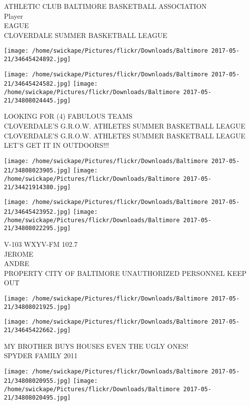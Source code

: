 \documentclass[10pt,letterpaper]{article}
\begin{document}
ATHLETIC CLUB BALTIMORE BASKETBALL ASSOCIATION\\
Player\\
EAGUE\\
CLOVERDALE SUMMER BASKETBALL LEAGUE
\pagebreak

\texttt{[image: /home/swickape/Pictures/flickr/Downloads/Baltimore 2017-05-21/34645424892.jpg]}

\vspace{0.25in}
\texttt{[image: /home/swickape/Pictures/flickr/Downloads/Baltimore 2017-05-21/34645424582.jpg]}
\texttt{[image: /home/swickape/Pictures/flickr/Downloads/Baltimore 2017-05-21/34808024445.jpg]}

LOOKING FOR (4) FABULOUS TEAMS\\
CLOVERDALE'S G.R.O.W. ATHLETES SUMMER BASKETBALL LEAGUE\\
CLOVERDALE'S G.R.O.W. ATHLETES SUMMER BASKETBALL LEAGUE LET'S GET IT IN OUTDOORS!!!
\pagebreak

\texttt{[image: /home/swickape/Pictures/flickr/Downloads/Baltimore 2017-05-21/34808023905.jpg]}
\texttt{[image: /home/swickape/Pictures/flickr/Downloads/Baltimore 2017-05-21/34421914380.jpg]}

\texttt{[image: /home/swickape/Pictures/flickr/Downloads/Baltimore 2017-05-21/34645423952.jpg]}
\texttt{[image: /home/swickape/Pictures/flickr/Downloads/Baltimore 2017-05-21/34808022295.jpg]}

V{-}103 WXYV{-}FM 102.7\\
JEROME\\
ANDRE\\
PROPERTY CITY OF BALTIMORE UNAUTHORIZED PERSONNEL KEEP OUT
\pagebreak

\texttt{[image: /home/swickape/Pictures/flickr/Downloads/Baltimore 2017-05-21/34808021925.jpg]}

\vspace{0.25in}
\texttt{[image: /home/swickape/Pictures/flickr/Downloads/Baltimore 2017-05-21/34645422662.jpg]}

MY BROTHER BUYS HOUSES EVEN THE UGLY ONES!\\
SPYDER FAMILY 2011
\pagebreak

\texttt{[image: /home/swickape/Pictures/flickr/Downloads/Baltimore 2017-05-21/34808020955.jpg]}
\texttt{[image: /home/swickape/Pictures/flickr/Downloads/Baltimore 2017-05-21/34808020495.jpg]}
\end{document}
